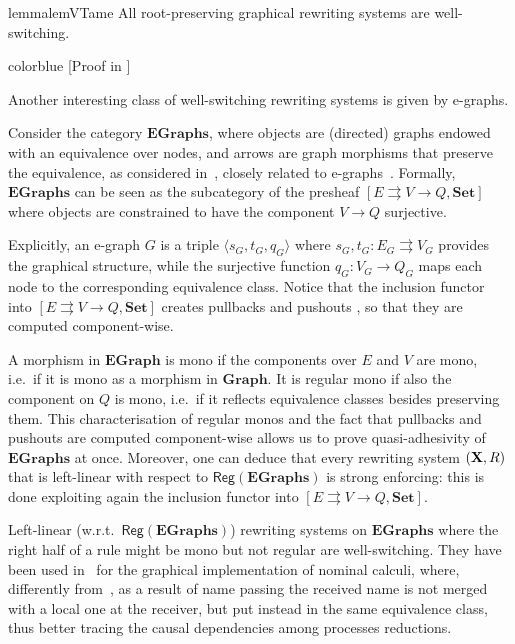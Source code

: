 \documentclass[a4paper,UKenglish,cleveref,pdftex,thm-restate,numberwithinsect]{lipics-v2021}
\newcommand{\full}[1]{{color{blue}#1}}
\newcommand{\full}[1]{}
\newcommand{\reg}{\mathsf{Reg}}
\newcommand{\cat}[1]{\ensuremath{\mathbf{#1}}}
\def\R{\mathsf{R}}
\def\X{\textbf {\textup{X}}}
\begin{document}

\begin{restatable}{lemma}{lemVTame}
\label{bono}
  All root-preserving graphical rewriting systems are well-switching.
\end{restatable}

\full{
[Proof in ]
}

Another interesting class of well-switching rewriting systems is given by e-graphs.

\begin{example}[E-graphs]
  Consider the category $\cat{EGraphs}$, where objects are (directed)
  graphs endowed with an equivalence over nodes, and arrows are graph
  morphisms that preserve the equivalence, as considered
  in~\cite{BaldanGM06}, closely related to e-graphs~\cite{WNW:egg}. 
  Formally, $\cat{EGraphs}$ can be seen as the
  subcategory of the presheaf
  $[E \rightrightarrows V \to Q, \cat{Set}]$ where objects are
  constrained to have the component $V \to Q$ surjective. 
  
  Explicitly, an
  e-graph $G$ is a triple $\langle s_G, t_G, q_G \rangle$ where
  $s_G, t_G: E_G \rightrightarrows V_G$ provides the graphical
  structure, while the surjective function $q_G : V_G \to Q_G$ maps
  each node to the corresponding equivalence class. 
  Notice that the inclusion functor into  $[E \rightrightarrows V \to Q, \cat{Set}]$ 
  creates pullbacks and pushouts \cite{mac2013categories}, so that they are computed component-wise.
  
  A morphism in $\cat{EGraph}$ is mono if the components over $E$
  and $V$ are mono, i.e.~if it is mono as a morphism in
  $\cat{Graph}$. It is regular mono if also the component on
  $Q$ is mono, i.e.~if it reflects equivalence classes besides
  preserving them. This characterisation of regular monos and the fact that pullbacks and pushouts are computed component-wise allows us to prove quasi-adhesivity of $\cat{EGraphs}$ at once. Moreover, one can deduce that every rewriting system $(\X, \R)$ that is left-linear with respect to $\reg(\cat{EGraphs})$ is strong enforcing: this is done exploiting again the inclusion functor into $[E \rightrightarrows V \to Q, \cat{Set}]$.
  
Left-linear (w.r.t.~$\reg(\cat{EGraphs})$) rewriting systems on $\cat{EGraphs}$ where the right half of a rule might be mono but not regular 
are well-switching. They have been used in~\cite{BaldanGM06} for the graphical implementation of nominal calculi, where,
differently from~\cite{Gad07}, as a result of name passing the received name is not merged with a local one at the receiver,
but put instead in the same equivalence class, thus better tracing the causal dependencies among processes reductions.
\end{example}
\end{document}
